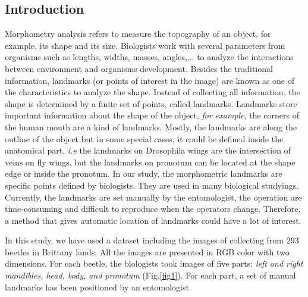 \documentclass{article} %
\begin{document}
\begin{multicols}{2}



\section{ Introduction}
Morphometry analysis refers to measure the topography of an object, for example, its shape and its size. Biologists work with several parameters from organisms such as lengths, widths, masses, angles,... to analyze the interactions between environment and organisms development. Besides the traditional information, landmarks (or points of interest in the image) are known as one of the characteristics to analyze the shape. Instead of collecting all information, the shape is determined by a finite set of points, called landmarks. Landmarks store important information about the shape of the object, \textit{for example}, the corners of the human mouth are a kind of landmarks. Mostly, the landmarks are along the outline of the object but in some special cases, it could be defined inside the anatomical part, \textit{i.e} the landmarks on Drosophila wings are the intersection of veins on fly wings, but the landmarks on pronotum can be located at the shape edge or inside the pronotum. In our study, the morphometric landmarks are specific points defined by biologists. They are used in many biological studyings. Currently, the landmarks are set manually by the entomologist, the operation are time-consuming and difficult to reproduce when the operators change. Therefore, a method that gives automatic location of landmarks could have a lot of interest.

In this study, we have used a dataset including the images of collecting from $293$ beetles in Brittany lands. All the images are presented in RGB color with two dimensions. For each beetle, the biologists took images of five parts: \textit{left and right mandibles, head, body, and pronotum} (Fig.\ref{fig1}). For each part, a set of manual landmarks has been positioned by an entomologist.


\end{multicols}
\end{document}
